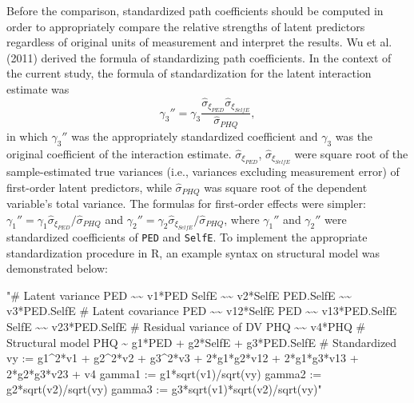 \documentclass[
  man]{apa7}
\newenvironment{Shaded}{\begin{snugshade}}{\end{snugshade}}
\newcommand{\StringTok}[1]{\textcolor[rgb]{0.31,0.60,0.02}{#1}}
\begin{document}
Before the comparison, standardized path coefficients should be computed in order to appropriately compare the relative strengths of latent predictors regardless of original units of measurement and interpret the results. Wu et al. (2011) derived the formula of standardizing path coefficients. In the context of the current study, the formula of standardization for the latent interaction estimate was
\begin{equation}
\gamma_{3}'' = \gamma_{3} \frac{\hat{\sigma}_{\xi_{PED}}\hat{\sigma}_{\xi_{SelfE}}}{\hat{\sigma}_{PHQ}},
\end{equation}
in which \(\gamma_{3}''\) was the appropriately standardized coefficient and \(\gamma_{3}\) was the original coefficient of the interaction estimate. \(\hat{\sigma}_{\xi_{PED}}\), \(\hat{\sigma}_{\xi_{SelfE}}\) were square root of the sample-estimated true variances (i.e., variances excluding measurement error) of first-order latent predictors, while \(\hat{\sigma}_{PHQ}\) was square root of the dependent variable's total variance. The formulas for first-order effects were simpler: \(\gamma_{1}'' = \gamma_{1}\hat{\sigma}_{\xi_{PED}}/\hat{\sigma}_{PHQ}\) and \(\gamma_{2}'' = \gamma_{2}\hat{\sigma}_{\xi_{SelfE}}/\hat{\sigma}_{PHQ}\), where \(\gamma_{1}''\) and \(\gamma_{2}''\) were standardized coefficients of \texttt{PED} and \texttt{SelfE}. To implement the appropriate standardization procedure in R, an example syntax on structural model was demonstrated below:

\begin{Shaded}
\begin{Highlighting}[]
\StringTok{"\# Latent variance}
\StringTok{   PED \textasciitilde{}\textasciitilde{} v1*PED}
\StringTok{   SelfE \textasciitilde{}\textasciitilde{} v2*SelfE}
\StringTok{   PED.SelfE \textasciitilde{}\textasciitilde{} v3*PED.SelfE}
\StringTok{ \# Latent covariance}
\StringTok{   PED \textasciitilde{}\textasciitilde{} v12*SelfE}
\StringTok{   PED \textasciitilde{}\textasciitilde{} v13*PED.SelfE}
\StringTok{   SelfE \textasciitilde{}\textasciitilde{} v23*PED.SelfE}
\StringTok{ \# Residual variance of DV}
\StringTok{   PHQ \textasciitilde{}\textasciitilde{} v4*PHQ}
\StringTok{ \# Structural model}
\StringTok{   PHQ \textasciitilde{} g1*PED + g2*SelfE + g3*PED.SelfE}
\StringTok{ \# Standardized}
\StringTok{   vy := g1\^{}2*v1 + g2\^{}2*v2 + g3\^{}2*v3 + 2*g1*g2*v12 + }
\StringTok{         2*g1*g3*v13 + 2*g2*g3*v23 + v4}
\StringTok{   gamma1 := g1*sqrt(v1)/sqrt(vy)}
\StringTok{   gamma2 := g2*sqrt(v2)/sqrt(vy)}
\StringTok{   gamma3 := g3*sqrt(v1)*sqrt(v2)/sqrt(vy)"}
\end{Highlighting}
\end{Shaded}
\end{document}
